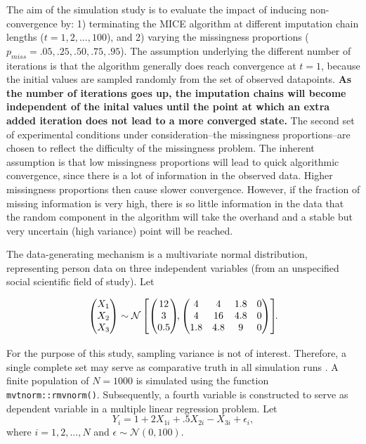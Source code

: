 \documentclass[Royal,times,sageh]{sagej}
\begin{document}
The aim of the simulation study is to evaluate the impact of inducing
non-convergence by: 1) terminating the MICE algorithm at different
imputation chain lengths (\(t = 1, 2, ..., 100\)), and 2) varying the
missingness proportions (\(p_{miss} = .05, .25, .50, .75, .95\)). The
assumption underlying the different number of iterations is that the
algorithm generally does reach convergence at \(t=1\), because the
initial values are sampled randomly from the set of observed datapoints.
\textbf{As the number of iterations goes up, the imputation chains will
become independent of the inital values until the point at which an
extra added iteration does not lead to a more converged state.} The
second set of experimental conditions under consideration--the
missingness proportions--are chosen to reflect the difficulty of the
missingness problem. The inherent assumption is that low missingness
proportions will lead to quick algorithmic convergence, since there is a
lot of information in the observed data. Higher missingness proportions
then cause slower convergence. However, if the fraction of missing
information is very high, there is so little information in the data
that the random component in the algorithm will take the overhand and a
stable but very uncertain (high variance) point will be reached.

The data-generating mechanism is a multivariate normal distribution,
representing person data on three independent variables (from an
unspecified social scientific field of study). Let

\begin{align*}
\begin{pmatrix}X_1\\
X_2\\
X_3
\end{pmatrix} \sim  \mathcal{N}
\begin{bmatrix}
\begin{pmatrix}
12\\
3\\
0.5
\end{pmatrix}\!\!,
\begin{pmatrix}
4 & 4 & 1.8 & 0\\
4 & 16 & 4.8 & 0\\
1.8 & 4.8 & 9 & 0
\end{pmatrix}
\end{bmatrix}\!\!\text{.}\\[2\jot]
\end{align*} For the purpose of this study, sampling variance is not of
interest. Therefore, a single complete set may serve as comparative
truth in all simulation runs \citep{vinknd}. A finite population of
\(N=1000\) is simulated using the function \texttt{mvtnorm::rmvnorm()}.
Subsequently, a fourth variable is constructed to serve as dependent
variable in a multiple linear regression problem. Let \[
Y_i =  1 + 2X_{1i} + .5X_{2i} - X_{3i} + \epsilon_i ,
\] where \(i = 1, 2, ..., N\) and \(\epsilon \sim \mathcal{N}(0, 100)\).
\end{document}
